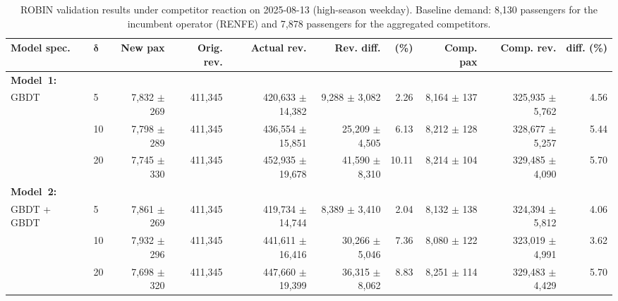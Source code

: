 \begin{table}[!h]
    \centering
    \caption{ROBIN validation results under competitor reaction on 2025-08-13 (high-season weekday). Baseline demand: 8,130 passengers for the incumbent operator (RENFE) and 7,878 passengers for the aggregated competitors.}
    \label{tab:model2_validation_2025_08_13}
    \scriptsize
    \setlength{\tabcolsep}{3pt}
    \begin{tabular}{llrrrrrrrr}
        \toprule
        \textbf{Model spec.}
        & \(\boldsymbol{\delta}\)
        & \textbf{New pax}
        & \textbf{Orig. rev.}
        & \textbf{Actual rev.}
        & \textbf{Rev. diff.}
        & \textbf{(\%)}
        & \textbf{Comp. pax}
        & \textbf{Comp. rev.}
        & \textbf{diff. (\%)} \\
        \midrule
        \multicolumn{10}{l}{\textbf{Model~1:}} \\[1ex]
        \multirow{3}{*}{GBDT} & 5 & 7,832 $\pm$ 269 & 411,345 & 420,633 $\pm$ 14,382 & 9,288 $\pm$ 3,082 & 2.26 & 8,164 $\pm$ 137 & 325,935 $\pm$ 5,762 & 4.56 \\
         & 10 & 7,798 $\pm$ 289 & 411,345 & 436,554 $\pm$ 15,851 & 25,209 $\pm$ 4,505 & 6.13 & 8,212 $\pm$ 128 & 328,677 $\pm$ 5,257 & 5.44 \\
         & 20 & 7,745 $\pm$ 330 & 411,345 & 452,935 $\pm$ 19,678 & 41,590 $\pm$ 8,310 & 10.11 & 8,214 $\pm$ 104 & 329,485 $\pm$ 4,090 & 5.70 \\
        \midrule
        \multicolumn{10}{l}{\textbf{Model~2:}} \\
        \multirow{3}{*}{GBDT + GBDT} & 5 & 7,861 $\pm$ 269 & 411,345 & 419,734 $\pm$ 14,744 & 8,389 $\pm$ 3,410 & 2.04 & 8,132 $\pm$ 138 & 324,394 $\pm$ 5,812 & 4.06 \\
         & 10 & 7,932 $\pm$ 296 & 411,345 & 441,611 $\pm$ 16,416 & 30,266 $\pm$ 5,046 & 7.36 & 8,080 $\pm$ 122 & 323,019 $\pm$ 4,991 & 3.62 \\
         & 20 & 7,698 $\pm$ 320 & 411,345 & 447,660 $\pm$ 19,399 & 36,315 $\pm$ 8,062 & 8.83 & 8,251 $\pm$ 114 & 329,483 $\pm$ 4,429 & 5.70 \\
        \bottomrule
    \end{tabular}
\end{table}